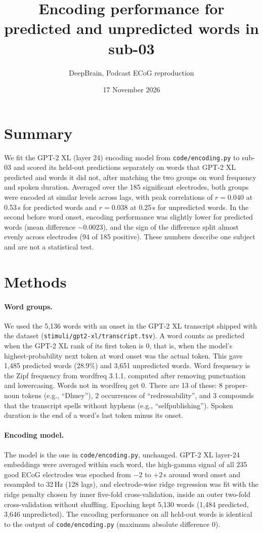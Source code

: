 \documentclass[11pt]{article}
\title{Encoding performance for predicted and unpredicted words in sub-03}
\author{DeepBrain, Podcast ECoG reproduction}
\date{17 November 2026}
\begin{document}
\maketitle

\section*{Summary}

We fit the GPT-2 XL (layer 24) encoding model from \texttt{code/encoding.py} to sub-03 and scored its held-out predictions separately on words that GPT-2 XL predicted and words it did not, after matching the two groups on word frequency and spoken duration. Averaged over the 185 significant electrodes, both groups were encoded at similar levels across lags, with peak correlations of $r = 0.040$ at 0.53\,s for predicted words and $r = 0.038$ at 0.25\,s for unpredicted words. In the second before word onset, encoding performance was slightly lower for predicted words (mean difference $-0.0023$), and the sign of the difference split almost evenly across electrodes (94 of 185 positive). These numbers describe one subject and are not a statistical test.

\section{Methods}

\paragraph{Word groups.}
We used the 5,136 words with an onset in the GPT-2 XL transcript shipped with the dataset (\texttt{stimuli/gpt2-xl/transcript.tsv}). A word counts as predicted when the GPT-2 XL rank of its first token is 0, that is, when the model's highest-probability next token at word onset was the actual token. This gave 1,485 predicted words (28.9\%) and 3,651 unpredicted words. Word frequency is the Zipf frequency from wordfreq 3.1.1, computed after removing punctuation and lowercasing. Words not in wordfreq get 0. There are 13 of these: 8 proper-noun tokens (e.g., ``Dhuey''), 2 occurrences of ``redressability'', and 3 compounds that the transcript spells without hyphens (e.g., ``selfpublishing''). Spoken duration is the end of a word's last token minus its onset.

\paragraph{Encoding model.}
The model is the one in \texttt{code/encoding.py}, unchanged. GPT-2 XL layer-24 embeddings were averaged within each word, the high-gamma signal of all 235 good ECoG electrodes was epoched from $-2$ to $+2$\,s around word onset and resampled to 32\,Hz (128 lags), and electrode-wise ridge regression was fit with the ridge penalty chosen by inner five-fold cross-validation, inside an outer two-fold cross-validation without shuffling. Epoching kept 5,130 words (1,484 predicted, 3,646 unpredicted). The encoding performance on all held-out words is identical to the output of \texttt{code/encoding.py} (maximum absolute difference 0).
\end{document}
